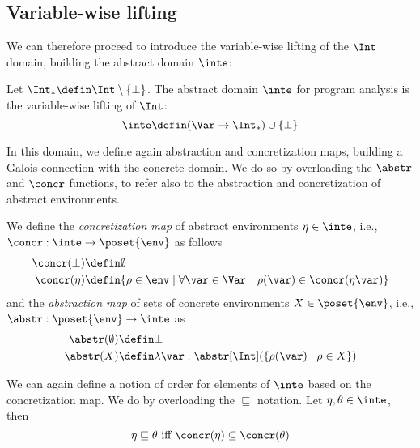 \subsection{Variable-wise lifting}
\label{sub:vwintervals}

We can therefore proceed to introduce the variable-wise lifting of the
\(\Int\) domain, building the abstract domain \(\inte\):

\begin{definition}
  Let \(\Int_* \defin \Int \setminus \{\bot\}\). The abstract domain
  \(\inte\) for program analysis is the variable-wise lifting of
  \(\Int\):
  \[ \inte \defin (\Var \to \Int_*) \cup \{ \bot \} \]
\end{definition}

In this domain, we define again abstraction and concretization maps,
building a Galois connection with the concrete domain. We do so by
overloading the \(\abstr\) and \(\concr\) functions, to refer also to
the abstraction and concretization of abstract environments.

\begin{definition}
  \label{def:vwabstr}
  We define the \emph{concretization map} of abstract environments
  \(\eta \in \inte\), i.e., \(\concr : \inte \to \poset{\env}\) as
  follows
  \begin{align*}
    \concr(\bot) & \defin \emptyset \\
    \concr(\eta) & \defin \{\rho \in \env \mid \forall \var \in \Var \quad \rho(\var) \in \concr(\eta\var)\}
  \end{align*}
  and the \emph{abstraction map} of sets of concrete environments
  \(X \in \poset{\env}\), i.e., \(\abstr : \poset{\env} \to \inte\) as
  \begin{align*}
    \abstr(\emptyset) & \defin \bot \\
    \abstr(X) & \defin \lambda \var \; . \; \abstr[\Int](\{\rho(\var) \mid \rho \in X\}) \\
  \end{align*}
\end{definition}

We can again define a notion of order for elements of \(\inte\) based
on the concretization map. We do by overloading the 
\(\sqsubseteq\) notation. Let \(\eta, \theta \in \inte\), then
\begin{equation*}
  \eta \sqsubseteq \theta \text{ iff } \concr(\eta) \subseteq \concr(\theta)
\end{equation*}

